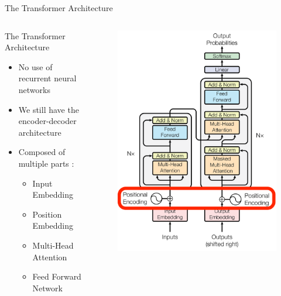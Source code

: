 \documentclass[aspectratio=169]{beamer}
\begin{document}
\begin{frame}{The Transformer Architecture}
\begin{columns}
\begin{column}{0.5\textwidth}
	\centering

   The Transformer Architecture \cite{vaswani2017attention}
   
   	\vspace{.5cm}
	\raggedright
   \begin{itemize}
   	\item No use of recurrent neural networks
	\item We still have the encoder-decoder architecture
	\item Composed of multiple parts :
	\begin{itemize}
		\item Input Embedding
		\item Position Embedding
		\item Multi-Head Attention
		\item Feed Forward Network
	\end{itemize}
   \end{itemize}
\end{column}
\begin{column}{0.5\textwidth}  %
    \begin{center}
    \vspace{-1.3cm}
    \begin{figure}
    \begin{overprint}
    	 \includegraphics[height=\paperheight]{figures/transformer_pos_embed}

\end{overprint}
\end{figure}
\end{center}
\end{column}
\end{columns}
\end{frame}
\end{document}
